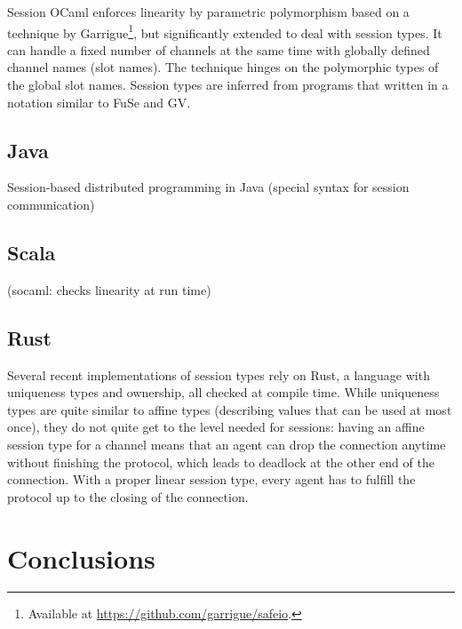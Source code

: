 \documentclass[acmsmall,screen,anonymous,review]{acmart}
\begin{document}
Session OCaml \cite{DBLP:journals/scp/ImaiYY19} enforces linearity by
parametric polymorphism based on a technique by
Garrigue\footnote{Available at
  \url{https://github.com/garrigue/safeio}.}, but significantly
extended to deal with session types.
It can handle a fixed number of channels at the same time with
globally defined channel names (slot names). The technique hinges on
the polymorphic types of the global slot names.
Session types are inferred from programs that written in a notation
similar to FuSe and GV.


\subsection{Java}
\label{sec:java}

Session-based distributed programming in Java
\cite{DBLP:conf/ecoop/HuYH08} (special syntax for session
communication)

\subsection{Scala}
\label{sec:scala}

\cite{DBLP:conf/ecoop/ScalasY16} (socaml: checks linearity at run time)

\subsection{Rust}
\label{sec:rust}



Several recent implementations of session types rely on Rust, a
language with uniqueness types and ownership, all checked at compile
time. While uniqueness types are quite similar to affine types
(describing values that can be used at most once), they do not quite
get to the level needed for sessions: having an affine session type
for a channel means that an agent can drop the connection anytime
without finishing the protocol, which leads to deadlock at the other
end of the connection. With a proper linear session type, every agent has to
fulfill the protocol up to the closing of the connection.

\cite{DBLP:conf/ecoop/ChenBT22}
\cite{DBLP:conf/ecoop/LagaillardieNY22}
\cite{DBLP:conf/ppopp/CutnerYV22}
\cite{DBLP:conf/coordination/CutnerY21}
\cite{DBLP:conf/coordination/LagaillardieNY20}
\cite{DBLP:journals/corr/abs-1909-05970}
\cite{DBLP:conf/icfp/JespersenML15}

\section{Conclusions}
\label{sec:conclusions}
\end{document}
